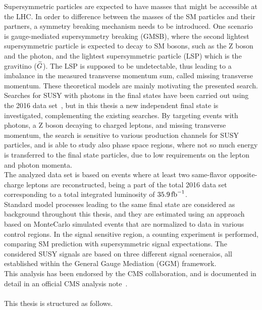 Supersymmetric particles are expected to have masses that might be accessible at the LHC. In order to difference between the masses of the SM particles and their partners, a symmetry breaking mechanism needs to be introduced. One scenario is gauge-mediated supersymmetry breaking (GMSB), where the second lightest supersymmetric particle is expected to decay to SM bosons, such as the Z boson and the photon, and the lightest supersymmetric particle (LSP) which is the gravitino ($\widetilde{G}$). The LSP is supposed to be undetectable, thus leading to a imbalance in the measured transverse momentum sum, called missing transverse momentum. These theoretical models are mainly motivating the presented search. \\
Searches for SUSY with photons in the final states have been carried out using the 2016 data set~\cite{PhotonHT,PhotonMet,PhotonBJet,PhotonLepton}, but in this thesis a new independent final state is investigated, complementing the existing searches. By targeting events with photons, a Z boson decaying to charged leptons, and missing transverse momentum, the search is sensitive to various production channels for SUSY particles, and is able to study also phase space regions, where not so much energy is transferred to the final state particles, due to low requirements on the lepton and photon momenta.\\
The analyzed data set is based on events where at least two same-flavor opposite-charge leptons are reconstructed, being a part of the total 2016 data set corresponding to a total integrated luminosity of $35.9\mbox{\ensuremath{\,\text{fb}^\text{$-$1}}}$.\\
Standard model processes leading to the same final state are considered as background throughout this thesis, and they are estimated using an approach based on MonteCarlo simulated events that are normalized to data in various control regions. In the signal sensitive region, a counting experiment is performed, comparing SM prediction with supersymmetric signal expectations. The considered SUSY signals are based on three different signal sceneraios, all established within the General Gauge Mediation (GGM) framework.\\
This analysis has been endorsed by the CMS collaboration, and is documented in detail in an official CMS analysis note~\cite{MyAN}.\\\\
This thesis is structured as follows.
